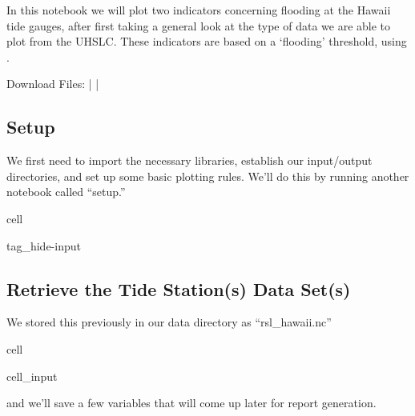 \documentclass[letterpaper,10pt,english]{jupyterBook}
\begin{document}
\sphinxAtStartPar
In this notebook we will plot two indicators concerning flooding at the Hawaii tide gauges, after first taking a general look at the type of data we are able to plot from the UHSLC. These indicators are based on a ‘flooding’ threshold, using .

\sphinxAtStartPar
Download Files:
 |
 |


\subsection{Setup}
\label{\detokenize{notebooks/FloodFrequency:setup}}
\sphinxAtStartPar
We first need to import the necessary libraries, establish our input/output directories, and set up some basic plotting rules. We’ll do this by running another notebook called “setup.”

\begin{sphinxuseclass}{cell}
\begin{sphinxuseclass}{tag_hide-input}
\end{sphinxuseclass}
\end{sphinxuseclass}

\subsection{Retrieve the Tide Station(s) Data Set(s)}
\label{\detokenize{notebooks/FloodFrequency:retrieve-the-tide-station-s-data-set-s}}
\sphinxAtStartPar
We stored this previously in our data directory as “rsl\_hawaii.nc”

\begin{sphinxuseclass}{cell}\begin{sphinxVerbatimInput}

\begin{sphinxuseclass}{cell_input}
\begin{sphinxVerbatim}[commandchars=\\\{\}]
    
\end{sphinxVerbatim}

\end{sphinxuseclass}\end{sphinxVerbatimInput}

\end{sphinxuseclass}
\sphinxAtStartPar
and we’ll save a few variables that will come up later for report generation.
\end{document}
